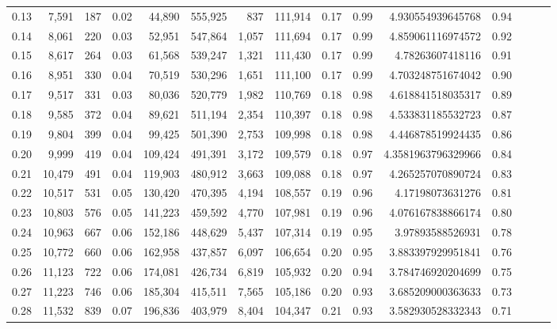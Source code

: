 \begin{tabular}{rrrrrrrrrrrrrrr}
0.13 &   7,591 &    187 &  0.02 &   44,890 &  555,925 &      837 &  111,914 &  0.17 &  0.99 &       4.930554939645768 &      0.94 \\
0.14 &   8,061 &    220 &  0.03 &   52,951 &  547,864 &    1,057 &  111,694 &  0.17 &  0.99 &       4.859061116974572 &      0.92 \\
0.15 &   8,617 &    264 &  0.03 &   61,568 &  539,247 &    1,321 &  111,430 &  0.17 &  0.99 &        4.78263607418116 &      0.91 \\
0.16 &   8,951 &    330 &  0.04 &   70,519 &  530,296 &    1,651 &  111,100 &  0.17 &  0.99 &       4.703248751674042 &      0.90 \\
0.17 &   9,517 &    331 &  0.03 &   80,036 &  520,779 &    1,982 &  110,769 &  0.18 &  0.98 &       4.618841518035317 &      0.89 \\
0.18 &   9,585 &    372 &  0.04 &   89,621 &  511,194 &    2,354 &  110,397 &  0.18 &  0.98 &       4.533831185532723 &      0.87 \\
0.19 &   9,804 &    399 &  0.04 &   99,425 &  501,390 &    2,753 &  109,998 &  0.18 &  0.98 &       4.446878519924435 &      0.86 \\
0.20 &   9,999 &    419 &  0.04 &  109,424 &  491,391 &    3,172 &  109,579 &  0.18 &  0.97 &      4.3581963796329966 &      0.84 \\
0.21 &  10,479 &    491 &  0.04 &  119,903 &  480,912 &    3,663 &  109,088 &  0.18 &  0.97 &       4.265257070890724 &      0.83 \\
0.22 &  10,517 &    531 &  0.05 &  130,420 &  470,395 &    4,194 &  108,557 &  0.19 &  0.96 &        4.17198073631276 &      0.81 \\
0.23 &  10,803 &    576 &  0.05 &  141,223 &  459,592 &    4,770 &  107,981 &  0.19 &  0.96 &       4.076167838866174 &      0.80 \\
0.24 &  10,963 &    667 &  0.06 &  152,186 &  448,629 &    5,437 &  107,314 &  0.19 &  0.95 &        3.97893588526931 &      0.78 \\
0.25 &  10,772 &    660 &  0.06 &  162,958 &  437,857 &    6,097 &  106,654 &  0.20 &  0.95 &       3.883397929951841 &      0.76 \\
0.26 &  11,123 &    722 &  0.06 &  174,081 &  426,734 &    6,819 &  105,932 &  0.20 &  0.94 &       3.784746920204699 &      0.75 \\
0.27 &  11,223 &    746 &  0.06 &  185,304 &  415,511 &    7,565 &  105,186 &  0.20 &  0.93 &       3.685209000363633 &      0.73 \\
0.28 &  11,532 &    839 &  0.07 &  196,836 &  403,979 &    8,404 &  104,347 &  0.21 &  0.93 &       3.582930528332343 &      0.71 \\

\end{tabular}
